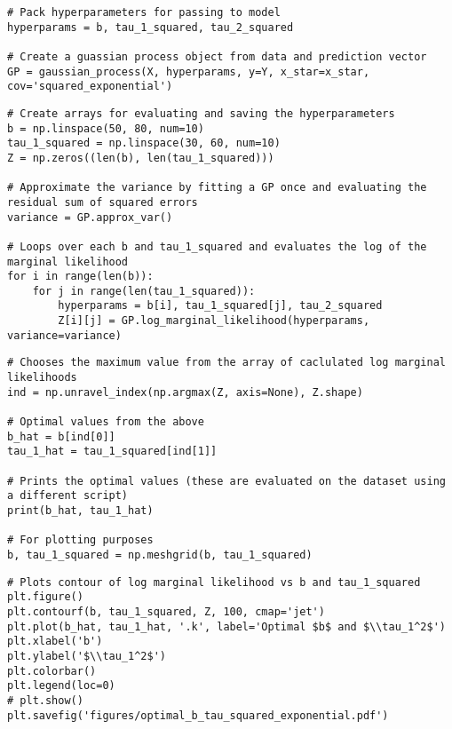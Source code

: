 \documentclass[10pt]{article}
\begin{document}
\begin{enumerate}[label=(\Alph*)]
\begin{lstlisting}
# Pack hyperparameters for passing to model
hyperparams = b, tau_1_squared, tau_2_squared

# Create a guassian process object from data and prediction vector
GP = gaussian_process(X, hyperparams, y=Y, x_star=x_star, cov='squared_exponential')
        \end{lstlisting}

        \begin{lstlisting}
# Create arrays for evaluating and saving the hyperparameters
b = np.linspace(50, 80, num=10)
tau_1_squared = np.linspace(30, 60, num=10)
Z = np.zeros((len(b), len(tau_1_squared)))

# Approximate the variance by fitting a GP once and evaluating the residual sum of squared errors
variance = GP.approx_var()

# Loops over each b and tau_1_squared and evaluates the log of the marginal likelihood
for i in range(len(b)):
    for j in range(len(tau_1_squared)):
        hyperparams = b[i], tau_1_squared[j], tau_2_squared
        Z[i][j] = GP.log_marginal_likelihood(hyperparams, variance=variance)
        \end{lstlisting}

        \begin{lstlisting}
# Chooses the maximum value from the array of caclulated log marginal likelihoods
ind = np.unravel_index(np.argmax(Z, axis=None), Z.shape)

# Optimal values from the above
b_hat = b[ind[0]]
tau_1_hat = tau_1_squared[ind[1]]

# Prints the optimal values (these are evaluated on the dataset using a different script)
print(b_hat, tau_1_hat)

# For plotting purposes
b, tau_1_squared = np.meshgrid(b, tau_1_squared)
        \end{lstlisting}

        \begin{lstlisting}
# Plots contour of log marginal likelihood vs b and tau_1_squared
plt.figure()
plt.contourf(b, tau_1_squared, Z, 100, cmap='jet')
plt.plot(b_hat, tau_1_hat, '.k', label='Optimal $b$ and $\\tau_1^2$')
plt.xlabel('b')
plt.ylabel('$\\tau_1^2$')
plt.colorbar()
plt.legend(loc=0)
# plt.show()
plt.savefig('figures/optimal_b_tau_squared_exponential.pdf')
        \end{lstlisting}


\end{enumerate}
\end{document}
